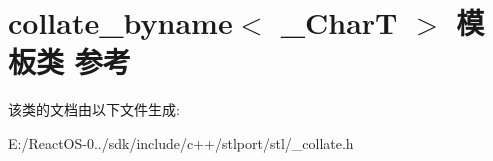 \hypertarget{classcollate__byname}{}\section{collate\+\_\+byname$<$ \+\_\+\+CharT $>$ 模板类 参考}
\label{classcollate__byname}


该类的文档由以下文件生成\+:\begin{DoxyCompactItemize}
\item 
E\+:/\+React\+O\+S-\/0../sdk/include/c++/stlport/stl/\+\_\+collate.\+h\end{DoxyCompactItemize}
